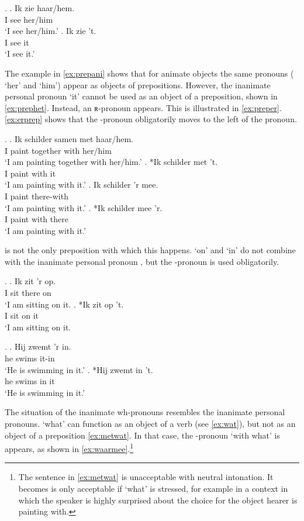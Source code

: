 \documentclass[12pt]{article}
\begin{document}
 \ex. \label{ex:objverb}
 \ag. Ik zie haar/hem.\\
  I see her/him\\
  `I see her/him.'\label{ex:aniobj}
 \bg. Ik zie 't.\\
  I see it\\
  `I see it.'\label{ex:inaniobj}

The example in \ref{ex:prepani} shows that for animate objects the same pronouns ( `her' and  `him') appear as objects of prepositions. However, the inanimate personal pronoun  `it' cannot be used as an object of a preposition, shown in \ref{ex:prephet}. Instead, an ʀ-pronoun appears. This is illustrated in \ref{ex:preper}. \ref{ex:erprep} shows that the -pronoun obligatorily moves to the left of the pronoun.

\ex. \label{ex:objprep}
\ag. Ik schilder samen met haar/hem.\\
 I paint together with her/him\\
 `I am painting together with her/him.'\label{ex:prepani}
\bg. *Ik schilder met 't.\\
 I paint with it\\
 `I am painting with it.'\label{ex:prephet}
\bg. Ik schilder 'r mee.\\
 I paint there-with\\
 `I am painting with it.'\label{ex:preper}
\bg. *Ik schilder mee 'r.\\
 I paint with there\\
 `I am painting with it.'\label{ex:erprep}

 is not the only preposition with which this happens.  `on' and  `in' do not combine with the inanimate personal pronoun , but the -pronoun is used obligatorily.

\ex.
\ag. Ik zit 'r op.\\
 I sit there on\\
 `I am sitting on it.
\bg. *Ik zit op 't.\\
 I sit on it\\
 `I am sitting on it.

\ex.
 \ag. Hij zwemt 'r in.\\
  he swims it-in\\
  `He is swimming in it.'
 \bg. *Hij zwemt in 't.\\
  he swims in it\\
  `He is swimming in it.'

The situation of the inanimate wh-pronouns resembles the inanimate personal pronouns.  `what' can function as an object of a verb (see \ref{ex:wat}), but not as an object of a preposition \ref{ex:metwat}. In that case, the -pronoun  `with what' is appears, as shown in \ref{ex:waarmee}.\footnote{The sentence in \ref{ex:metwat} is unacceptable with neutral intonation. It becomes is only acceptable if  `what' is stressed, for example in a context in which the speaker is highly surprised about the choice for the object hearer is painting with.}
\end{document}
